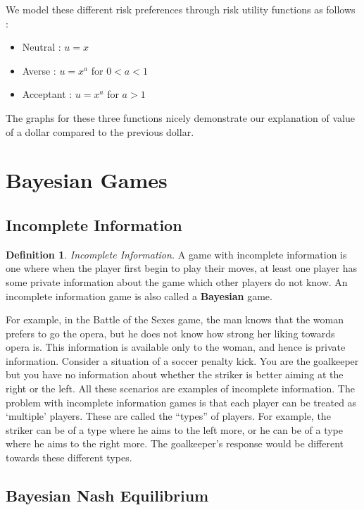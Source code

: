 \documentclass{article}
\theoremstyle{definition}
\newtheorem{defn}[theorem]{Definition}
\begin{document}
We model these different risk preferences through risk utility functions as follows :
\begin{itemize}
    \item Neutral : $u = x$
    \item Averse : $u = x^a$ for $0 < a < 1$
    \item Acceptant : $u = x^a$ for $a > 1$
\end{itemize}

The graphs for these three functions nicely demonstrate our explanation of value of a dollar compared to the previous dollar. 


\section{Bayesian Games}

\subsection{Incomplete Information}

\begin{defn}
    \textit{Incomplete Information.} A game with incomplete information is one where when the player first begin to play their moves, at least one player has some private information about the game which other players do not know. An incomplete information game is also called a \textbf{Bayesian} game.
\end{defn}

For example, in the Battle of the Sexes game, the man knows that the woman prefers to go the opera, but he does not know how strong her liking towards opera is. This information is available only to the woman, and hence is private information. Consider a situation of a soccer penalty kick. You are the goalkeeper but you have no information about whether the striker is better aiming at the right or the left. All these scenarios are examples of incomplete information. The problem with incomplete information games is that each player can be treated as `multiple' players. These are called the ``types'' of players. For example, the striker can be of a type where he aims to the left more, or he can be of a type where he aims to the right more. The goalkeeper's response would be different towards these different types.

\subsection{Bayesian Nash Equilibrium}
\end{document}
